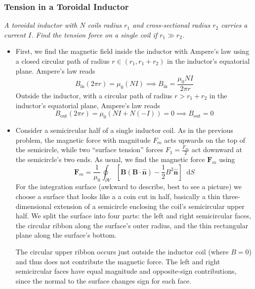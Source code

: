 \documentclass[11pt, a4paper]{article}
\newcommand{\diff}{\mathop{}\!\mathrm{d}} %
\renewcommand{\vec}[1]{\bm{#1}} %
\newcommand{\uvec}[1]{\hat{\vec{#1}}} %
\newcommand{\B}{\vec{B}}  %
\begin{document}
\subsubsection{Tension in a Toroidal Inductor}
\textit{A toroidal inductor with $ N $ coils radius $ r_{1} $ and cross-sectional radius $ r_{2} $ carries a current $ I $. Find the tension force on a single coil if $ r_{1} \gg r_{2} $.}
\begin{itemize}
	\item First, we find the magnetic field inside the inductor with Ampere's law using a closed circular path of radius $ r \in (r_{1}, r_{1} + r_{2}) $ in the inductor's equatorial plane. Ampere's law reads
	\begin{equation*}
		B_{\text{in}} (2\pi r) = \mu_{0} (NI) \implies B_{\text{in}} = \frac{\mu_{0}NI}{2\pi r}
	\end{equation*}
	Outside the inductor, with a circular path of radius $ r > r_{1} + r_{2} $ in the inductor's equatorial plane, Ampere's law reads
	\begin{equation*}
		B_{\text{out}} (2\pi r) = \mu_{0} (NI + N(-I)) = 0 \implies B_{\text{out}} = 0
	\end{equation*}
	
	\item Consider a semicircular half of a single inductor coil. As in the previous problem, the magnetic force with magnitude $ F_{m} $ acts upwards on the top of the semicircle, while two ``surface tension'' forces $ F_{1} = \frac{F_{m}}{2} $ act downward at the semicircle's two ends. As usual, we find the magnetic force $ \vec{F}_{m} $ using
	\begin{equation*}
		\vec{F}_{m} = \frac{1}{\mu_{0}}\oint_{\partial V}\left [\B(\B \cdot \uvec{n}) - \frac{1}{2}B^{2}\uvec{n}\right ] \diff S
	\end{equation*}
	For the integration surface (awkward to describe, best to see a picture) we choose a surface that looks like a a coin cut in half, basically a thin three-dimensional extension of a semicircle enclosing the coil's semicircular upper half. We split the surface into four parts: the left and right semicircular faces, the circular ribbon along the surface's outer radius, and the thin rectangular plane along the surface's bottom. 
	
	The circular upper ribbon occurs just outside the inductor coil (where $ B = 0 $) and thus does not contribute the magnetic force. The left and right semicircular faces have equal magnitude and opposite-sign contributions, since the normal to the surface changes sign for each face. 
	

\end{itemize}
\end{document}
